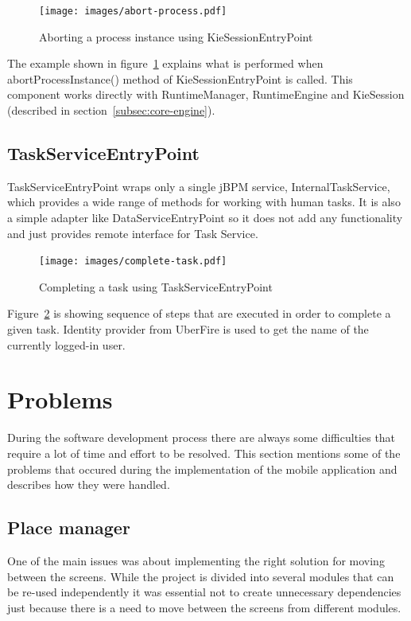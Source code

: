 \documentclass[12pt,oneside,final]{fithesis2}
\begin{document}
\begin{figure}[ht!]
\centering
\texttt{[image: images/abort-process.pdf]}
\caption{Aborting a process instance using KieSessionEntryPoint}
\label{fig:abort-process}
\end{figure}

The example shown in figure~\ref{fig:abort-process} explains what is performed when abortProcessInstance() method of KieSessionEntryPoint is called.
This component works directly with RuntimeManager, RuntimeEngine and KieSession (described in section~\ref{subsec:core-engine}).

\subsection{TaskServiceEntryPoint}

TaskServiceEntryPoint wraps only a single jBPM service, InternalTaskService, which provides a wide range of methods for working with human tasks.
It is also a simple adapter like DataServiceEntryPoint so it does not add any functionality and just provides remote interface for Task Service.

\begin{figure}[ht!]
\centering
\texttt{[image: images/complete-task.pdf]}
\caption{Completing a task using TaskServiceEntryPoint}
\label{fig:complete-task}
\end{figure}

Figure~\ref{fig:complete-task} is showing sequence of steps that are executed in order to complete a given task.
Identity provider from UberFire is used to get the name of the currently logged-in user.

\section{Problems}
During the software development process there are always some difficulties that require a lot of time and effort to be resolved.
This section mentions some of the problems that occured during the implementation of the mobile application and describes how they were handled.

\subsection{Place manager}
One of the main issues was about implementing the right solution for moving between the screens.
While the project is divided into several modules that can be re-used independently it was essential not to create unnecessary dependencies just because there is a need to move between the screens from different modules.
\end{document}
